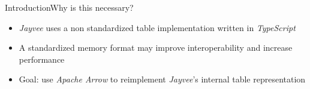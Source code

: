 \begin{frame}[t]{Introduction}{Why is this necessary?}
	\begin{itemize}
		\item \emph{Jayvee} uses a non standardized table implementation written in  \emph{TypeScript}
		\item A standardized memory format may improve interoperability and increase performance
		\item Goal: use \emph{Apache Arrow} to reimplement \emph{Jayvee}'s internal table representation
	\end{itemize}
\end{frame}

